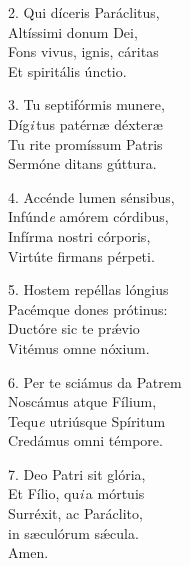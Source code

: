 \begin{multicols}{2}
	\setlength{\parskip}{0.5em}
	2. Qui díceris Paráclitus,\\
	Altíssimi donum Dei,\\
	Fons vivus, ignis, cáritas\\
	Et spiritális únctio.

	3. Tu septifórmis munere,\\
	Díg{\it i}\,tus patérn\ae{} déxter\ae{}\\
	Tu rite promíssum Patris\\
	Sermóne ditans gúttura.

	4. Accénde lumen sénsibus,\\
	Infúnd{\it e} amórem córdibus,\\
	Infírma nostri córporis,\\
	Virtúte firmans pérpeti.

	5. Hostem repéllas lóngius\\
	Pacémque dones prótinus:\\
	Ductóre sic te pr\'{\ae}vio\\
	Vitémus omne nóxium.

	6. Per te sciámus da Patrem\\
	Noscámus atque Fílium,\\
	Tequ{\it e} utriúsque Spíritum\\
	Credámus omni témpore. 

	7. Deo Patri sit glória,\\
	Et Fílio, qu{\it i}\,a mórtuis\\
	Surréxit, ac Paráclito,\\
	in s\ae{}culórum s\'{\ae}cula.\\
	Amen.
\end{multicols}
